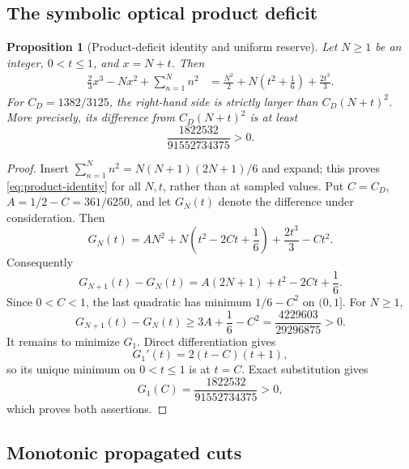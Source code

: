 \documentclass[11pt]{article}
\newtheorem{proposition}[theorem]{Proposition}
\theoremstyle{definition}
\theoremstyle{remark}
\begin{document}
\subsection{The symbolic optical product deficit}

\begin{proposition}[Product-deficit identity and uniform reserve]
\label{prop:product-deficit}
Let \(N\geq1\) be an integer, \(0<t\leq1\), and \(x=N+t\).  Then
\begin{align}
 \frac23x^3-Nx^2+\sum_{n=1}^N n^2
 &=\frac{N^2}{2}+N\left(t^2+\frac16\right)+\frac{2t^3}{3}.
 \label{eq:product-identity}
\end{align}
For
\(C_D=1382/3125\), the right-hand side is strictly larger than
\(C_D(N+t)^2\).  More precisely, its difference from
\(C_D(N+t)^2\) is at least
\begin{equation}
 \frac{1822532}{91552734375}>0.
 \label{eq:product-margin}
\end{equation}
\end{proposition}

\begin{proof}
Insert
\(\sum_{n=1}^Nn^2=N(N+1)(2N+1)/6\) and expand; this proves
\eqref{eq:product-identity} for all \(N,t\), rather than at sampled
values.  Put \(C=C_D\), \(A=1/2-C=361/6250\), and let \(G_N(t)\)
denote the difference under consideration.  Then
\[
 G_N(t)=AN^2+N\left(t^2-2Ct+\frac16\right)
       +\frac{2t^3}{3}-Ct^2.
\]
Consequently
\[
 G_{N+1}(t)-G_N(t)
 =A(2N+1)+t^2-2Ct+\frac16.
\]
Since \(0<C<1\), the last quadratic has minimum \(1/6-C^2\) on
\((0,1]\).  For \(N\geq1\),
\[
 G_{N+1}(t)-G_N(t)
 \geq3A+\frac16-C^2
 =\frac{4229603}{29296875}>0.
\]
It remains to minimize \(G_1\).  Direct differentiation gives
\[
 G_1'(t)=2(t-C)(t+1),
\]
so its unique minimum on \(0<t\leq1\) is at \(t=C\).  Exact
substitution gives
\[
 G_1(C)=\frac{1822532}{91552734375}>0,
\]
which proves both assertions.
\end{proof}

\subsection{Monotonic propagated cuts}
\end{document}
